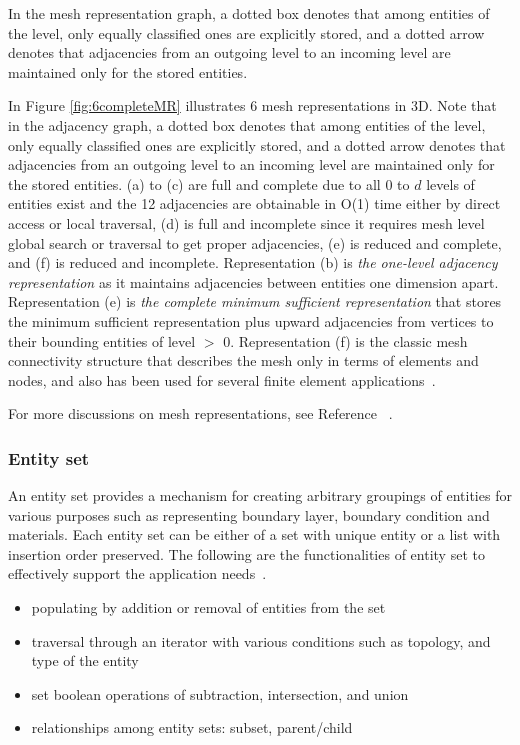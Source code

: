 In the mesh representation graph, a dotted box denotes that among entities of the level, only equally
classified ones are explicitly stored, and a dotted arrow denotes that adjacencies
from an outgoing level to an incoming level are maintained only for the stored
entities.

In Figure \ref{fig:6completeMR} illustrates 6 mesh representations in 3D. Note that in the adjacency graph, a dotted box denotes that among entities of the level, only equally
classified ones are explicitly stored, and a dotted arrow denotes that adjacencies
from an outgoing level to an incoming level are maintained only for the stored
entities. (a) to (c) are full and complete due to all $0$ to $d$ levels of entities exist and the 12
adjacencies are obtainable in O(1) time either by direct access or local
traversal, (d) is full and incomplete
since it requires mesh level global search or traversal to get proper
adjacencies, (e) is reduced and complete, and (f) is reduced and incomplete. Representation (b) is \emph{the one-level adjacency representation} as it maintains adjacencies between entities one dimension apart. Representation (e) is \emph{the complete minimum sufficient representation} that
stores the minimum sufficient representation plus upward adjacencies from
vertices to their bounding entities of level $>$ 0. Representation
(f) is the classic mesh connectivity structure 
that describes the mesh only in terms of elements and nodes, and also has been used
for several finite element applications~\cite{beall97}.

For more discussions on mesh representations, see Reference ~\cite{seolthesis}.

\subsubsection{Entity set}

An entity set provides a mechanism for creating arbitrary groupings of entities for various purposes such as representing boundary layer, boundary condition and materials. Each entity set can be either of a set with unique entity or a list with insertion order preserved. The following are the functionalities of entity set to effectively support the application needs~\cite{itapsweb, Ollivier-etal06}.
 
\begin{itemize}
\item populating by addition or removal of entities from the set
\item traversal through an iterator with various conditions such as topology, and type of the entity
\item set boolean operations of subtraction, intersection, and union
\item relationships among entity sets: subset, parent/child
\end{itemize}

